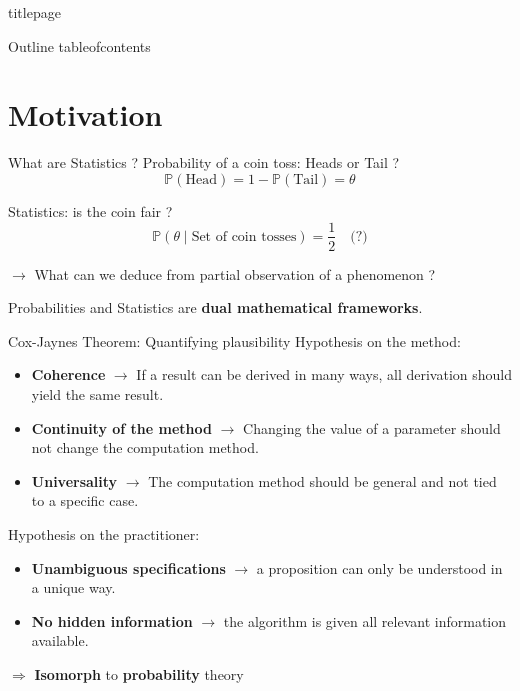 \documentclass{beamer}
\renewcommand{\P}{\mathbb{P}}
\newcommand{\1}{\mathbf{1}}
\newcommand{\robustcmd}[1]{\csname #1\endcsname}
\begin{document}
\begin{frame}
  \robustcmd{titlepage}
\end{frame}

\begin{frame}{Outline}
  \robustcmd{tableofcontents}
\end{frame}

\section{Motivation}

\begin{frame}{What are Statistics ?}
  \vspace{0.8cm}
  Probability of a coin toss: Heads or Tail ?
  \[\P(\text{Head}) = 1 - \P(\text{Tail}) = \theta\]

  \vspace{0.8cm}
  Statistics: is the coin fair ?
  \[\P(\theta \mid \text{Set of coin tosses}) = \frac{1}{2} \quad \text{(?)}\]

  $\longrightarrow$ What can we deduce from partial observation of a phenomenon ?\\

  {
    \begin{center}
      Probabilities and Statistics are \textbf{dual mathematical frameworks}.
    \end{center}
  }

\end{frame}

\begin{frame}{Cox-Jaynes Theorem: Quantifying plausibility}
  Hypothesis on the method:
  \begin{itemize}
    \item \textbf{Coherence} $\rightarrow$ If a result can be derived in many ways, all derivation should yield the same result.
    \item \textbf{Continuity of the method} $\rightarrow$ Changing the value of a parameter should not change the computation method.
    \item \textbf{Universality} $\rightarrow$ The computation method should be general and not tied to a specific case.
  \end{itemize}
  \vspace{0.5cm}
  Hypothesis on the practitioner:
  \begin{itemize}
    \item \textbf{Unambiguous specifications} $\rightarrow$ a proposition can only be understood in a unique way.
    \item \textbf{No hidden information} $\rightarrow$ the algorithm is given all relevant information available.
  \end{itemize}

  \centering
  $\Longrightarrow$ \textbf{Isomorph} to \textbf{probability} theory
\end{frame}
\end{document}
